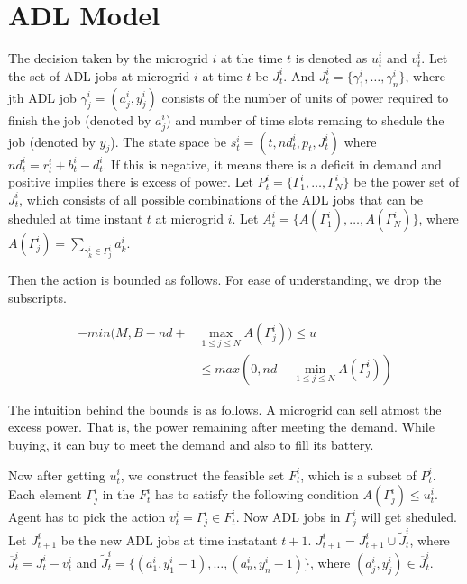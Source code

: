 \section{ADL Model}





The decision taken by the microgrid $i$ at the time $t$ is denoted as $u_{t}^{i}$ and $v_{t}^{i}$.
Let the set of ADL jobs at microgrid $i$ at time $t$ be $J_{t}^{i}$. And  $J_{t}^{i}= \{\gamma_{1}^{i},\ldots,\gamma_{n}^{i}\}$, where jth ADL job $\gamma_{j}^{i} = (a_{j}^{i}, y_{j}^{i})$ consists of the number of units of power required to finish the job (denoted by  $a_{j}^{i}$) and number of time slots remaing to shedule the  job (denoted by  $y_{j}$).
The state space be $s_{t}^{i} = (t,nd_{t}^{i},p_{t}, J_{t}^{i})$ where $nd_{t}^{i} = r_{t}^{i} + b_{t}^{i} - d_{t}^{i}$. If this is negative, it means there is a deficit in demand and positive implies there is excess of power.
Let $P_{t}^{i} = \{\Gamma_{1}^{i},\ldots,\Gamma_{N}^{i}\}$ be the power set of $J_{t}^{i}$, which consists of all possible combinations of the ADL jobs that can be sheduled at time instant $t$ at microgrid $i$. 
Let  $A_{t}^{i} = \{A(\Gamma_{1}^{i}),\ldots,A(\Gamma_{N}^{i})\} $, where $A(\Gamma_{j}^{i}) = \sum_{\gamma_{k}^{i} \in \Gamma_{j}^{i} } a_{k}^{i}$.


Then the action is bounded as follows. For ease of understanding, we drop the subscripts.  

\begin{align}
-min(M, B - nd + &\max_{1\leq j \leq N} A(\Gamma_{j}^{i}) ) \leq u \nonumber\\ &\leq max(0, nd - \min_{1\leq j \leq N} A(\Gamma_{j}^{i}))
\end{align}

The intuition behind the bounds is as follows. A microgrid can sell atmost the excess power. That is, the power remaining after meeting the demand. While buying, it can buy to meet the demand and also to fill its battery.

Now after getting $u_{t}^{i}$, we construct the feasible set $F_{t}^{i}$, which is a subset of $P_{t}^{i}$. Each element $\Gamma_{j}^{i}$ in the $F_{t}^{i}$ has to satisfy the following condition $A(\Gamma_{j}^{i}) \leq u_{t}^{i} $.
Agent has to pick the action $v_{t}^{i} = \Gamma_{j}^{i} \in F_{t}^{i}$. Now ADL jobs in $\Gamma_{j}^{i}$ will get sheduled. Let $J_{t+1}^{i}$ be the new ADL jobs at time instatant $t+1$. $J_{t+1}^{i} = J_{t+1}^{i} \cup \widetilde J_{t}^{i}$, where $\overline J_{t}^{i} = J_{t}^{i} - v_{t}^{i}$ and $\widetilde J_{t}^{i} =  \{(a_{1}^{i}, y_{1}^{i} - 1),\ldots,(a_{n}^{i}, y_{n}^{i} - 1)\}$, where $ (a_{j}^{i}, y_{j}^{i}) \in \overline J_{t}^{i}$.

